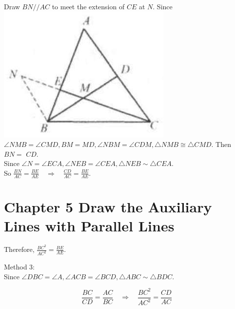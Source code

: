 \documentclass[10pt]{article}
\begin{document}
Draw \(B N / / A C\) to meet the extension of \(C E\) at \(N\). Since\\
\includegraphics[max width=\textwidth]{2025_04_17_97bc1f7e44d93c271a88g-115(2)} \(\angle N M B=\angle C M D, B M=M D, \angle N B M=\angle C D M, \triangle N M B \cong \triangle C M D\). Then \(B N=\) \(C D\).\\
Since \(\angle N=\angle E C A, \angle N E B=\angle C E A, \triangle N E B \sim \triangle C E A\).\\
So \(\frac{B N}{A C}=\frac{B E}{A E} \quad \Rightarrow \quad \frac{C D}{A C}=\frac{B E}{A E}\).

\section*{Chapter 5 Draw the Auxiliary Lines with Parallel Lines}
Therefore, \(\frac{B C^{2}}{A C^{2}}=\frac{B E}{A E}\).

Method 3:\\
Since \(\angle D B C=\angle A, \angle A C B=\angle B C D, \triangle A B C \sim \triangle B D C\).

\[
\frac{B C}{C D}=\frac{A C}{B C} \quad \Rightarrow \quad \frac{B C^{2}}{A C^{2}}=\frac{C D}{A C}
\]
\end{document}
